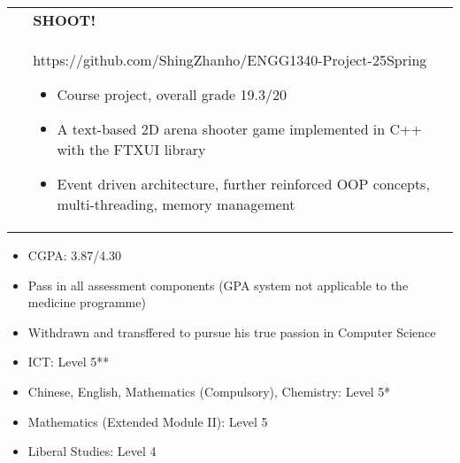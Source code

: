 \documentclass[10pt,a4paper,withhypeper,normalphoto]{altacv}
\makeatletter
\newcommand{\cvachievementAlt}[3]{%
  \begin{tabularx}{\linewidth}{@{}p{2em} @{\hspace{1ex}} >{\raggedright\arraybackslash}X@{}}
  \multirow{2}{*}{\,\,\Large\color{accent}#1} & \bfseries\textcolor{emphasis}{#2}\\
  & #3
  \end{tabularx}%
  \smallskip
}
\makeatother
\begin{document}
\begin{paracol}{2}
\divider

\cvachievementAlt{\simpleicon{cplusplus}}{SHOOT!}{
https://github.com/ShingZhanho/ENGG1340-Project-25Spring
\begin{itemize}
  \item Course project, overall grade 19.3/20
  \item A text-based 2D arena shooter game implemented in C++ with the FTXUI library
  \item Event driven architecture, further reinforced OOP concepts, multi-threading,
        memory management
\end{itemize}
}


\switchcolumn



\begin{itemize}
  \item CGPA: 3.87/4.30
\end{itemize}

\divider

\begin{itemize}
  \item Pass in all assessment components (GPA system not applicable to the medicine programme)
  \item Withdrawn and transffered to pursue his true passion in Computer Science
\end{itemize}

\divider

\begin{itemize}
  \item ICT: Level 5**
  \item Chinese, English, Mathematics (Compulsory),
  Chemistry: Level 5*
  \item Mathematics (Extended Module II): Level 5
  \item Liberal Studies: Level 4
\end{itemize}



\end{paracol}
\end{document}
